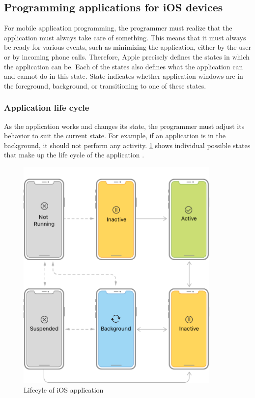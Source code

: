 \documentclass[
  biblatex = false,
  language=english,
  figures=false,
  sourcecodes,
  glossaries,
  index
]{kidiplom}
\begin{document}
\subsection{Programming applications for iOS devices}
For mobile application programming, the programmer must realize that the application must always take care of something. This means that it must always be ready for various events, such as minimizing the application, either by the user or by incoming phone calls. Therefore, Apple precisely defines the states in which the application can be. Each of the states also defines what the application can and cannot do in this state. State indicates whether application windows are in the foreground, background, or transitioning to one of these states.

\subsubsection{Application life cycle}
As the application works and changes its state, the programmer must adjust its behavior to suit the current state. For example, if an application is in the background, it should not perform any activity. \ref{fig:image2} shows individual possible states that make up the life cycle of the application \cite{bib4}.

\begin{figure}[h]
\centering
\includegraphics[width=10cm]{image2}
\caption{Lifecyle of iOS application}
\label{fig:image2}
\end{figure}
\end{document}
